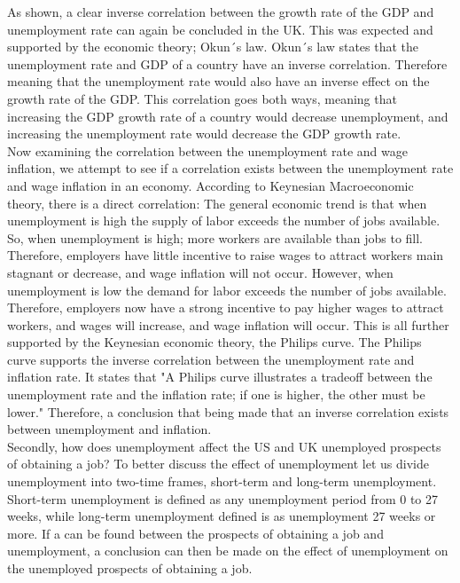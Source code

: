 As shown, a clear inverse correlation between the growth rate of the GDP and unemployment rate can again be concluded in the UK.
This was expected and supported by the economic theory; Okun´s law.
Okun´s law states that the unemployment rate and GDP of a country have an inverse correlation.
Therefore meaning that the unemployment rate would also have an inverse effect on the growth rate of the GDP. \cite{Economics_Okuns_Law}
This correlation goes both ways, meaning that increasing the GDP growth rate of a country would decrease unemployment, and increasing the unemployment rate would decrease the GDP growth rate. \\

Now examining the correlation between the unemployment rate and wage inflation, we attempt to see if a correlation exists between the unemployment rate and wage inflation in an economy.
According to Keynesian Macroeconomic theory, there is a direct correlation:
The general economic trend is that when unemployment is high the supply of labor exceeds the number of jobs available.
So, when unemployment is high; more workers are available than jobs to fill.
Therefore, employers have little incentive to raise wages to attract workers main stagnant or decrease, and wage inflation will not occur.
However, when unemployment is low the demand for labor exceeds the number of jobs available. 
Therefore, employers now have a strong incentive to pay higher wages to attract workers, and wages will increase, and wage inflation will occur.\cite{Economics_Unemployment_Inflation}
This is all further supported by the Keynesian economic theory, the Philips curve.
The Philips curve supports the inverse correlation between the unemployment rate and inflation rate.
It states that "A Philips curve illustrates a tradeoff between the unemployment rate and the inflation rate; if one is higher, the other must be lower." \cite{Economics_Philips_Curve}
Therefore, a conclusion that being made that an inverse correlation exists between unemployment and inflation. \\

Secondly, how does unemployment affect the US and UK unemployed prospects of obtaining a job?
To better discuss the effect of unemployment let us divide unemployment into two-time frames, short-term and long-term unemployment.
Short-term unemployment is defined as any unemployment period from 0 to 27 weeks, while long-term unemployment defined is as unemployment 27 weeks or more. \cite{Short_Long_unemployment_Defined}
If a  can be found between the prospects of obtaining a job and unemployment, a conclusion can then be made on the effect of unemployment on the unemployed prospects of obtaining a job.


